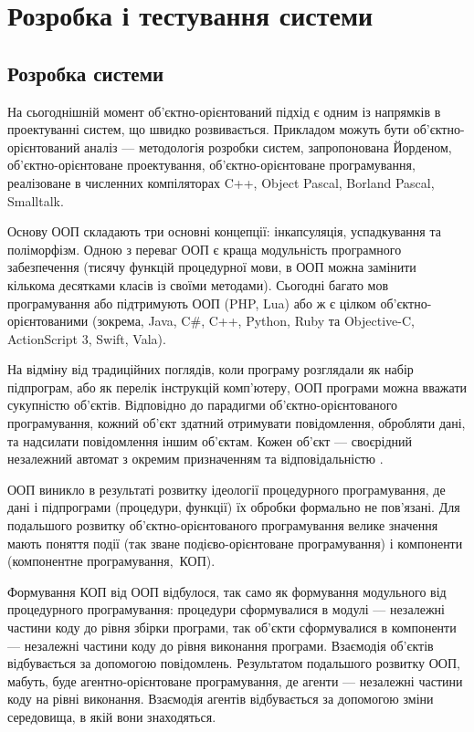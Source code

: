 \documentclass[../main.tex]{subfiles}
\begin{document}
\chapter{Розробка і тестування системи}

\section{Розробка системи}

На сьогоднішній момент об'єктно-\linebreak[0]орієнтований підхід є одним із напрямків в проектуванні систем, що швидко розвивається. Прикладом можуть бути об'єктно-\linebreak[0]орієнтований аналіз — методологія розробки систем, запропонована Йорденом, об'єктно-орієнтоване проектування, об'єктно-\linebreak[0]орієнтоване програмування, реалізоване в численних компіляторах C++, Object Pascal, Borland Pascal, Smalltalk.

Основу ООП складають три основні концепції: інкапсуляція, успадкування та поліморфізм. Одною з переваг ООП є краща модульність програмного забезпечення (тисячу функцій процедурної мови, в ООП можна замінити кількома десятками класів із своїми методами). Сьогодні багато мов програмування або підтримують ООП (PHP, Lua) або ж є цілком об'єктно-орієнтованими (зокрема, Java, C\#, C++, Python, Ruby та Objective-C, ActionScript 3, Swift, Vala).

На відміну від традиційних поглядів, коли програму розглядали як набір підпрограм, або як перелік інструкцій комп'ютеру, ООП програми можна вважати сукупністю об'єктів. Відповідно до парадигми об'єктно-\linebreak[0]орієнтованого програмування, кожний об'єкт здатний отримувати повідомлення, обробляти дані, та надсилати повідомлення іншим об'єктам. Кожен об'єкт — своєрідний незалежний автомат з окремим призначенням та відповідальністю \cite{object_oriented_analysis}.

ООП виникло в результаті розвитку ідеології процедурного програмування, де дані і підпрограми (процедури, функції) їх обробки формально не пов'язані. Для подальшого розвитку об'єктно-орієнтованого програмування велике значення мають поняття події (так зване подієво-орієнтоване програмування) і компоненти (компонентне програмування,~КОП).

Формування КОП від ООП відбулося, так само як формування модульного від процедурного програмування: процедури сформувалися в модулі — незалежні частини коду до рівня збірки програми, так об'єкти сформувалися в компоненти — незалежні частини коду до рівня виконання програми. Взаємодія об'єктів відбувається за допомогою повідомлень. Результатом подальшого розвитку ООП, мабуть, буде агентно-орієнтоване програмування, де агенти — незалежні частини коду на рівні виконання. Взаємодія агентів відбувається за допомогою зміни середовища, в якій вони знаходяться.
\end{document}
